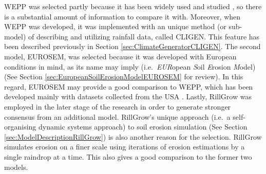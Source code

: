 WEPP was selected partly because it has been widely used and studied
\citep{zhang1996-855,baffaut1998-756,favis1999-329,pruski2002-climate,
pruski2002-7,flanagan2007-1603}, so there is a substantial amount of
information to compare it with. Moreover, when WEPP was developed, it was
implemented with an unique method (or sub-model) of describing and utilizing
rainfall data, called CLIGEN. This feature has been described previously in
Section \ref{sec:ClimateGeneratorCLIGEN}. The second model, EUROSEM, was
selected because it was developed with European conditions in mind, as its name
may imply (i.e.\ \emph{EUR}opean \emph{S}oil \emph{E}rosion \emph{M}odel) (See
Section \ref{sec:EuropeanSoilErosionModelEUROSEM} for review). In this regard,
EUROSEM may provide a good comparison to WEPP, which has been developed mainly
with datasets collected from the USA \citep{flanagan2007-1603}. Lastly, RillGrow
was employed in the later stage of the research in order to generate stronger
consensus from an additional model. RillGrow's unique approach (i.e.\ a
self-organising dynamic systems approach) to soil erosion simulation (See
Section \ref{sec:ModelDescriptionRillGrow}) is also another reason for the
selection. RillGrow simulates erosion on a finer scale using iterations of
erosion estimations by a single raindrop at a time. This also gives a good
comparison to the former two models.


